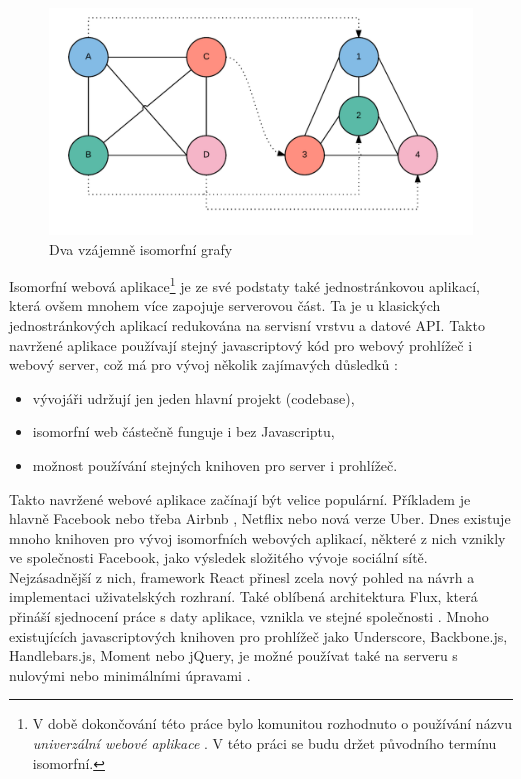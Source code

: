 \begin{figure}[h]
\begin{centering}
\includegraphics[scale=0.5]{obrazky/isomorphic_graph}
\par\end{centering}
\caption{Dva vzájemně isomorfní grafy \cite{isomorhic_book} \label{fig:isomorphic_graph}}
\end{figure}
\FloatBarrier

Isomorfní webová aplikace\footnote{V době dokončování této práce bylo komunitou rozhodnuto o používání názvu \textit{univerzální webové aplikace} \cite{universal_js}. V této práci se budu držet původního termínu isomorfní.} je ze své podstaty také jednostránkovou aplikací, která ovšem mnohem více zapojuje serverovou část. Ta je u klasických jednostránkových aplikací redukována na servisní vrstvu a datové API. Takto navržené aplikace používají stejný javascriptový kód pro webový prohlížeč i webový server, což má pro vývoj několik zajímavých důsledků \cite{isomorhic_book}:

\begin{itemize}
\item vývojáři udržují jen jeden hlavní projekt (codebase),
\item isomorfní web částečně funguje i bez Javascriptu,
\item možnost používání stejných knihoven pro server i prohlížeč.
\end{itemize}

Takto navržené webové aplikace začínají být velice populární. Příkladem je hlavně Facebook nebo třeba Airbnb \cite{isomorphic_airbnb} \cite{isomorphic_airbnb2}, Netflix \cite{netflix} nebo nová verze Uber. Dnes existuje mnoho knihoven pro vývoj isomorfních webových aplikací, některé z nich vznikly ve společnosti Facebook, jako výsledek složitého vývoje sociální sítě. Nejzásadnější z nich, framework React přinesl zcela nový pohled na návrh a implementaci uživatelských rozhraní. Také oblíbená architektura Flux, která přináší sjednocení práce s daty aplikace, vznikla ve stejné společnosti \cite{flux}. Mnoho existujících javascriptových knihoven pro prohlížeč jako Underscore, Backbone.js, Handlebars.js, Moment nebo jQuery, je možné používat také na serveru s nulovými nebo minimálními úpravami \cite{isomorphic_airbnb2}.

